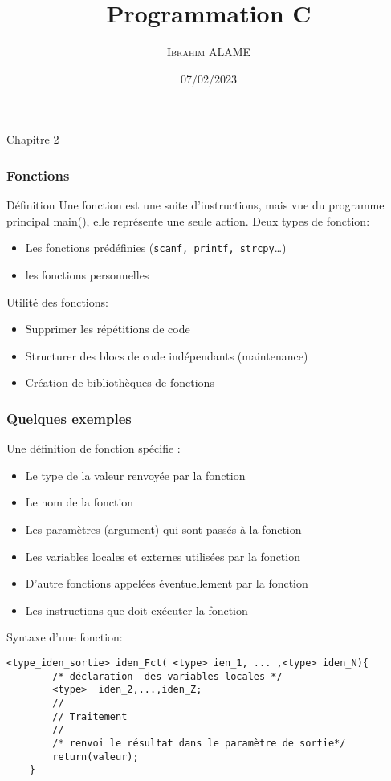 \documentclass{beamer}
\title{Programmation C}
\author{ \textsc{Ibrahim ALAME}}\institute{ESIEE}
\date{07/02/2023}
\begin{document}
 \begin{frame}
 \begin{center}
 Chapitre 2
 \end{center}
  \titlepage
  \end{frame}

 \begin{frame}
  \frametitle{Fonctions}
  \begin{block}{Définition}
 Une fonction est une suite d'instructions, mais vue du programme principal main(), elle représente une seule action.
Deux types de fonction:
\begin{itemize}
\item Les fonctions prédéfinies ({\tt scanf, printf, strcpy}…)
\item les fonctions personnelles
\end{itemize}
\end{block}

Utilité des fonctions:
\begin{itemize}
\item Supprimer les répétitions de code
\item Structurer des blocs de code indépendants (maintenance)
\item Création de bibliothèques de fonctions
\end{itemize}

  \end{frame}
  
\begin{frame}[fragile]
\frametitle{Quelques exemples}
Une définition de fonction spécifie :
\begin{itemize}
\item Le type de la valeur renvoyée par la fonction
\item Le nom de la fonction
\item Les paramètres (argument) qui sont passés à la fonction
\item Les variables locales et externes utilisées par la fonction
\item D'autre fonctions appelées éventuellement par la fonction
\item Les instructions que doit exécuter la fonction
\end{itemize}

Syntaxe d'une fonction:

\begin{verbatim}
<type_iden_sortie> iden_Fct( <type> ien_1, ... ,<type> iden_N){
        /* déclaration  des variables locales */
        <type>  iden_2,...,iden_Z;
        //
        // Traitement 
        //
        /* renvoi le résultat dans le paramètre de sortie*/
        return(valeur);
    }

\end{verbatim}

\end{frame}
  
\end{document}
